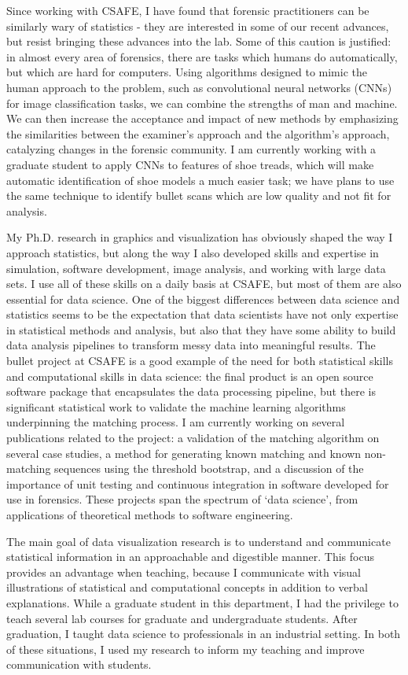 \documentclass[12pt, letterpaper, sans]{moderncv}
\begin{document}
Since working with CSAFE, I have found that forensic practitioners can be similarly wary of statistics - they are interested in some of our recent advances, but resist bringing these advances into the lab. Some of this caution is justified: in almost every area of forensics, there are tasks which humans do automatically, but which are hard for computers. Using algorithms designed to mimic the human approach to the problem, such as convolutional neural networks (CNNs) for image classification tasks, we can combine the strengths of man and machine. We can then increase the acceptance and impact of new methods by emphasizing the similarities between the examiner's approach and the algorithm's approach, catalyzing changes in the forensic community. I am currently working with a graduate student to apply CNNs to features of shoe treads, which will make automatic identification of shoe models a much easier task; we have plans to use the same technique to identify bullet scans which are low quality and not fit for analysis.

My Ph.D. research in graphics and visualization has obviously shaped the way I approach statistics, but along the way I also developed skills and expertise in simulation, software development, image analysis, and working with large data sets. I use all of these skills on a daily basis at CSAFE, but most of them are also essential for data science. One of the biggest differences between data science and statistics seems to be the expectation that data scientists have not only expertise in statistical methods and analysis, but also that they have some ability to build data analysis pipelines to transform messy data into meaningful results. The bullet project at CSAFE is a good example of the need for both statistical skills and computational skills in data science: the final product is an open source software package that encapsulates the data processing pipeline, but there is significant statistical work to validate the machine learning algorithms underpinning the matching process. I am currently working on several publications related to the project: a validation of the matching algorithm on several case studies, a method for generating known matching and known non-matching sequences using the threshold bootstrap, and a discussion of the importance of unit testing and continuous integration in software developed for use in forensics. These projects span the spectrum of `data science', from applications of theoretical methods to software engineering. 

The main goal of data visualization research is to understand and communicate statistical information in an approachable and digestible manner. This focus provides an advantage when teaching, because I communicate with visual illustrations of statistical and computational concepts in addition to verbal explanations. While a graduate student in this department, I had the privilege to teach several lab courses for graduate and undergraduate students. After graduation, I taught data science to professionals in an industrial setting. In both of these situations, I used my research to inform my teaching and improve communication with students. 
\end{document}

